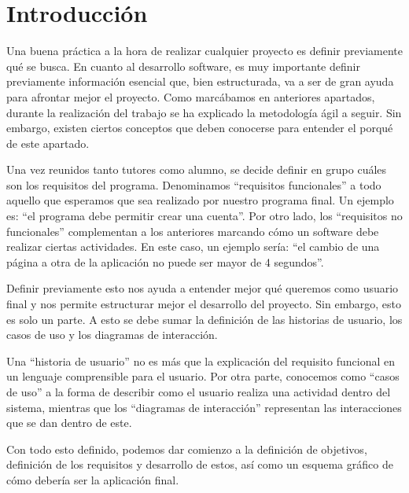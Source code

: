 
\section{Introducción}

	Una buena práctica a la hora de realizar cualquier proyecto es definir previamente qué se busca. En cuanto al desarrollo software, es muy importante definir previamente información esencial que, bien estructurada, va a ser de gran ayuda para afrontar mejor el proyecto. Como marcábamos en anteriores apartados, durante la realización del trabajo se ha explicado la metodología ágil a seguir. Sin embargo, existen ciertos conceptos que deben conocerse para entender el porqué de este apartado.	
	
	Una vez reunidos tanto tutores como alumno, se decide definir en grupo cuáles son los requisitos del programa. Denominamos ``requisitos funcionales'' a todo aquello que esperamos que sea realizado por nuestro programa final. Un ejemplo es: ``el programa debe permitir crear una cuenta''. Por otro lado, los ``requisitos no funcionales'' complementan a los anteriores marcando cómo un software debe realizar ciertas actividades. En este caso, un ejemplo sería: ``el cambio de una página a otra de la aplicación no puede ser mayor de 4 segundos''.
	
	Definir previamente esto nos ayuda a entender mejor qué queremos como usuario final y nos permite estructurar mejor el desarrollo del proyecto. Sin embargo, esto es solo un parte. A esto se debe sumar la definición de las historias de usuario, los casos de uso y los diagramas de interacción.
	
	Una ``historia de usuario'' no es más que la explicación del requisito funcional en un lenguaje comprensible para el usuario. Por otra parte, conocemos como ``casos de uso'' a la forma de describir como el usuario realiza una actividad dentro del sistema, mientras que los ``diagramas de interacción'' representan las interacciones que se dan dentro de este.
	
	Con todo esto definido, podemos dar comienzo a la definición de objetivos, definición de los requisitos y desarrollo de estos, así como un esquema gráfico de cómo debería ser la aplicación final.



